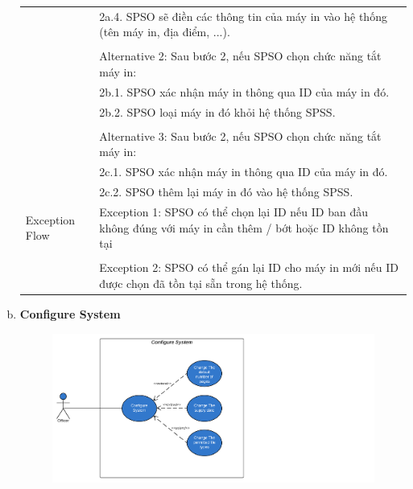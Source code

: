 \begin{enumerate}[a)]
\begin{longtable}{|l|p{10cm}|}
        & \hspace{1em} 2a.4. SPSO sẽ điền các thông tin của máy in vào hệ thống (tên máy in, địa điểm, ...).\\
        &\\
        &Alternative 2: Sau bước 2, nếu SPSO chọn chức năng tắt máy in:\\
        & \hspace{1em} 2b.1. SPSO xác nhận máy in thông qua ID của máy in đó.\\
        & \hspace{1em} 2b.2. SPSO loại máy in đó khỏi hệ thống SPSS.\\
        &\\
        &Alternative 3: Sau bước 2, nếu SPSO chọn chức năng tắt máy in:\\
        & \hspace{1em} 2c.1. SPSO xác nhận máy in thông qua ID của máy in đó.\\
        & \hspace{1em} 2c.2. SPSO thêm lại máy in đó vào hệ thống SPSS.\\
        \hline
        Exception Flow & Exception 1: SPSO có thể chọn lại ID nếu ID ban đầu không đúng với máy in cần thêm / bớt hoặc ID không tồn tại\\
        &\\
         & Exception 2: SPSO có thể gán lại ID cho máy in mới nếu ID được chọn đã tồn tại sẵn trong hệ thống.\\
    \end{longtable}
    
    \newpage
    \item{\textbf{Configure System}}
    \begin{center}
    \begin{figure}[htp]
    \begin{center}
     \includegraphics[scale=.62]{images/Task1/configureSystem.png}
    \end{center}
    \label{refhinh1}
    \end{figure}
    \end{center}


\end{enumerate}
